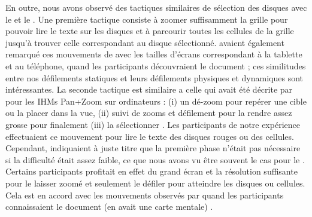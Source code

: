 
En outre, nous avons observé des tactiques similaires de sélection des disques avec le  et le . Une première tactique consiste à zoomer suffisamment la grille pour pouvoir lire le texte sur les disques et à parcourir toutes les cellules de la grille jusqu'à trouver celle correspondant au disque sélectionné. \cite{Raedle2014} avaient également remarqué ces mouvements de   avec les tailles d'écrans correspondant à la tablette et au téléphone, quand les participants découvraient le document ; ces similitudes entre nos défilements statiques et leurs défilements physiques et dynamiques sont intéressantes. La seconde tactique est similaire a celle qui avait été décrite par \cite{Guiard2004} pour les IHMs Pan+Zoom sur ordinateurs : (i) un dé-zoom pour repérer une cible ou la placer dans la vue, (ii) suivi de zooms et défilement pour la rendre assez grosse pour finalement (iii) la sélectionner . Les participants de notre expérience effectuaient ce mouvement pour lire le texte des disques rouges ou des cellules. Cependant, \cite{Guiard2004} indiquaient à juste titre que la première phase n'était pas nécessaire si la difficulté était assez faible, ce que nous avons vu être souvent le cas pour le . Certains participants profitait en effet du grand écran et la résolution suffisante pour le laisser zoomé et seulement le défiler pour atteindre les disques ou cellules. Cela est en accord avec les mouvements observés par \cite{Raedle2014} quand les participants connaissaient le document (en avait une carte mentale) .


